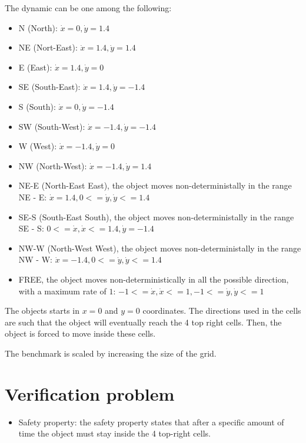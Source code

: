 \documentclass[11pt,twoside,a4paper]{article}
\begin{document}
The dynamic can be one among the following:
\begin{itemize}
\item N (North): $\dot{x} = 0    , \dot{y} = 1.4$
\item NE (Nort-East): $\dot{x} = 1.4  , \dot{y} = 1.4$
\item E (East): $\dot{x} = 1.4  , \dot{y} = 0$
\item SE (South-East): $\dot{x} = 1.4  , \dot{y} = -1.4$
\item S (South): $\dot{x} = 0    , \dot{y} = -1.4$
\item SW (South-West): $\dot{x} = -1.4 , \dot{y} = -1.4$
\item W (West): $\dot{x} = -1.4 , \dot{y} = 0$
\item NW (North-West): $\dot{x} = -1.4 , \dot{y} = 1.4$
\item NE-E (North-East East), the object moves non-deterministally in
  the range NE - E: $\dot{x} = 1.4, 0 <= \dot{y}, \dot{y} <= 1.4$
\item SE-S (South-East South), the object moves non-deterministally in
  the range SE - S: $0 <= \dot{x}, \dot{x} <= 1.4, \dot{y} = -1.4$
\item NW-W (North-West West), the object moves non-deterministally in
  the range NW - W: $\dot{x} = -1.4, 0 <= \dot{y}, \dot{y} <= 1.4$
\item FREE, the object moves non-deterministically in
  all the possible direction, with a maximum rate of $1$:
  $-1 <= \dot{x}, \dot{x}  <= 1, -1 <= \dot{y}, \dot{y}  <= 1$
\end{itemize}

The objects starts in $x=0$ and $y=0$ coordinates.
The directions used in the cells are such that the object will
eventually reach the 4 top right cells. Then, the object is forced to
move inside these cells.

The benchmark is scaled by increasing the size of the grid.


\section{Verification problem}

\begin{itemize}
\item Safety property: the safety property states that after a
  specific amount of time the object must stay inside the 4 top-right
  cells.
\end{itemize}
\end{document}
